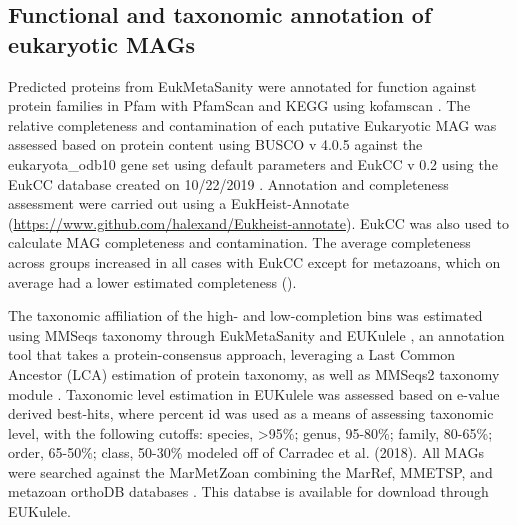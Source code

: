 \documentclass[12pt]{article}
\numberwithin{equation}{section}
\begin{document}
\subsection*{Functional and taxonomic annotation of eukaryotic MAGs} 

Predicted proteins from EukMetaSanity were annotated for function against protein families in Pfam with PfamScan \citep{Finn2014Pfam} and KEGG using kofamscan \citep{Kanehisa_2019, Aramaki_2019}. The relative completeness and contamination  of each putative Eukaryotic MAG was assessed based on protein content using BUSCO v 4.0.5 against the eukaryota\_odb10 gene set using default parameters \citep{Simao2015BUSCO} and EukCC v 0.2 using the EukCC database created on 10/22/2019 \citep{Saary2020Estimating}. Annotation and completeness assessment were carried out using a EukHeist-Annotate (\url{https://www.github.com/halexand/Eukheist-annotate}). EukCC \citep{Saary2020Estimating} was also used to calculate MAG completeness and contamination. The average completeness across groups increased in all cases with EukCC except for metazoans, which on average had a lower estimated completeness (). 

The taxonomic affiliation of the high- and low-completion bins was estimated using MMSeqs taxonomy through EukMetaSanity and EUKulele \citep{Krinos2021EUKulele}, an annotation tool that takes a protein-consensus approach, leveraging a Last Common Ancestor (LCA) estimation of protein taxonomy, as well as MMSeqs2 taxonomy module \citep{Steinegger2017, Steinegger2018, Mirdita2019}. Taxonomic level estimation in EUKulele was assessed based on e-value derived best-hits, where percent id was used as a means of assessing taxonomic level, with the following cutoffs: species, >95\%; genus, 95-80\%; family, 80-65\%; order, 65-50\%; class, 50-30\% modeled off of Carradec et al. (2018). All MAGs were searched against the MarMetZoan combining the MarRef, MMETSP, and metazoan orthoDB databases \citep{Johnson2018Re-assembly, Keeling2014, Kriventseva2018, Klemetsen:2017fg}. This databse is available for download through EUKulele. 
\end{document}
